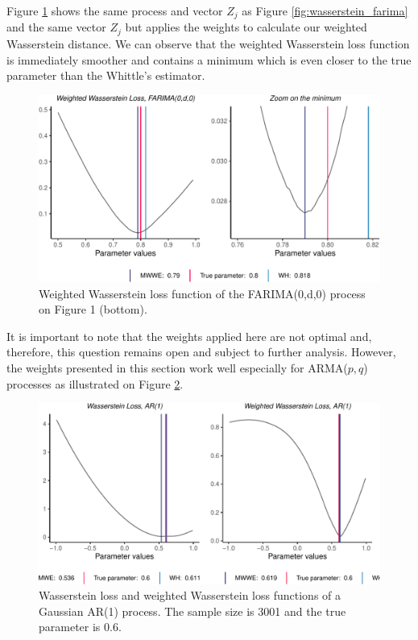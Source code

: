 \documentclass[
  11pt,
]{article}
\begin{document}
Figure \ref{fig:weighted_wasserstein} shows the same process and vector
\(Z_j\) as Figure \ref{fig:wasserstein_farima} and the same vector
\(Z_j\) but applies the weights to calculate our weighted Wasserstein
distance. We can observe that the weighted Wasserstein loss function is
immediately smoother and contains a minimum which is even closer to the
true parameter than the Whittle's estimator.

\begin{figure}

{\centering \includegraphics[width=0.75\linewidth]{Master_thesis_V1_files/figure-latex/weighted_wasserstein-1} 

}

\caption{Weighted Wasserstein loss function of the FARIMA(0,d,0) process on Figure 1 (bottom).}\label{fig:weighted_wasserstein}
\end{figure}

It is important to note that the weights applied here are not optimal
and, therefore, this question remains open and subject to further
analysis. However, the weights presented in this section work well
especially for ARMA(\(p,q\)) processes as illustrated on Figure
\ref{fig:wass_ar1}.

\begin{figure}

{\centering \includegraphics[width=0.7\linewidth]{Master_thesis_V1_files/figure-latex/wass_ar1-1} 

}

\caption{Wasserstein loss and weighted Wasserstein loss functions of a Gaussian AR(1) process. The sample size is 3001 and the true parameter is 0.6.}\label{fig:wass_ar1}
\end{figure}
\end{document}
